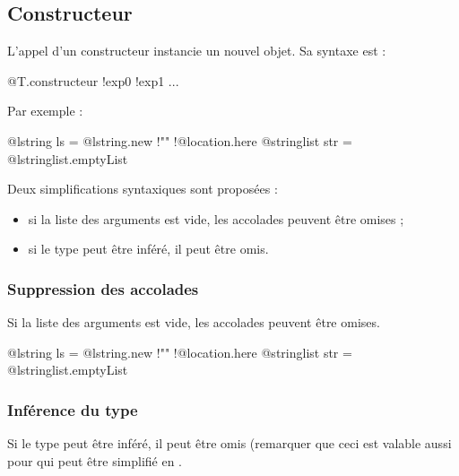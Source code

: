 








\subsection{Constructeur}

L'appel d'un constructeur instancie un nouvel objet. Sa syntaxe est :

\begin{galgascode}
@T.constructeur {!exp0 !exp1 ...}
\end{galgascode}

Par exemple :
\begin{galgascode}
@lstring ls = @lstring.new {!"" !@location.here{}}
@stringlist str = @lstringlist.emptyList {}
\end{galgascode}

Deux simplifications syntaxiques sont proposées :
\begin{itemize}
  \item si la liste des arguments est vide, les accolades peuvent être omises ;
  \item si le type peut être inféré, il peut être omis.
\end{itemize}


\subsubsection{Suppression des accolades}

Si la liste des arguments est vide, les accolades peuvent être omises.

\begin{galgascode}
@lstring ls = @lstring.new {!"" !@location.here}
@stringlist str = @lstringlist.emptyList
\end{galgascode}



\subsubsection{Inférence du type}

Si le type peut être inféré, il peut être omis (remarquer que ceci est valable aussi pour  qui peut être simplifié en .

